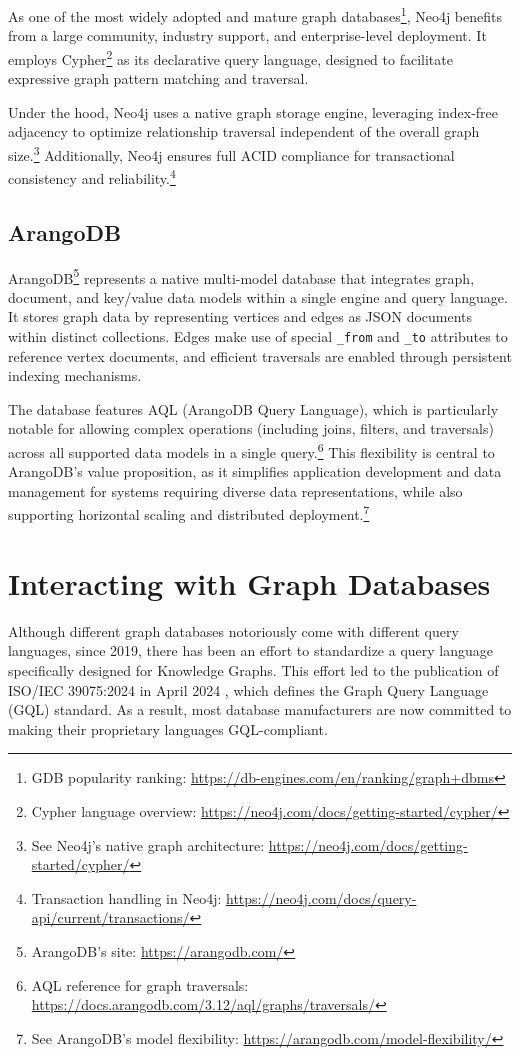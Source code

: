 As one of the most widely adopted and mature graph databases\footnote{GDB popularity ranking: \url{https://db-engines.com/en/ranking/graph+dbms}}, Neo4j benefits from a large community, industry support, and enterprise-level deployment. It employs Cypher\footnote{Cypher language overview: \url{https://neo4j.com/docs/getting-started/cypher/}} as its declarative query language, designed to facilitate expressive graph pattern matching and traversal.

Under the hood, Neo4j uses a native graph storage engine, leveraging index-free adjacency to optimize relationship traversal independent of the overall graph size.\footnote{See Neo4j's native graph architecture: \url{https://neo4j.com/docs/getting-started/cypher/}} Additionally, Neo4j ensures full ACID compliance for transactional consistency and reliability.\footnote{Transaction handling in Neo4j: \url{https://neo4j.com/docs/query-api/current/transactions/}}

\subsection{ArangoDB}

ArangoDB\footnote{ArangoDB's site: \url{https://arangodb.com/}} represents a native multi-model database that integrates graph, document, and key/value data models within a single engine and query language. It stores graph data by representing vertices and edges as JSON documents within distinct collections. Edges make use of special \texttt{\_from} and \texttt{\_to} attributes to reference vertex documents, and efficient traversals are enabled through persistent indexing mechanisms.

The database features AQL (ArangoDB Query Language), which is particularly notable for allowing complex operations (including joins, filters, and traversals) across all supported data models in a single query.\footnote{AQL reference for graph traversals: \url{https://docs.arangodb.com/3.12/aql/graphs/traversals/}} This flexibility is central to ArangoDB's value proposition, as it simplifies application development and data management for systems requiring diverse data representations, while also supporting horizontal scaling and distributed deployment.\footnote{See ArangoDB's model flexibility: \url{https://arangodb.com/model-flexibility/}}

\section{Interacting with Graph Databases}
Although different graph databases notoriously come with different query languages, since 2019, there has been an effort to standardize a query language specifically designed for Knowledge Graphs. This effort led to the publication of ISO/IEC 39075:2024 in April 2024 \cite{ISO}, which defines the Graph Query Language (GQL) standard. As a result, most database manufacturers are now committed to making their proprietary languages GQL-compliant.

